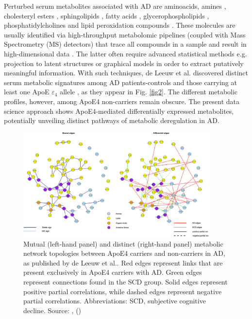 \documentclass{amsart}
\begin{document}
Perturbed serum metabolites associated with AD are aminoacids, amines \cite{deLeeuw2017Blood-basedDisease, Green2023InvestigatingDisease}, cholesteryl esters \cite{Proitsi2017AssociationAnalysis}, sphingolipids \cite{Varma2018BrainStudy,Sun2022AssociationDisease,Green2023InvestigatingDisease,Oeckl2019GlialImpairment,Barupal2019SetsPathophysiology}, fatty acids \cite{Fernandez-Calle2022APOEDiseases,deLeeuw2017Blood-basedDisease}, glycerophospholipids \cite{Varma2018BrainStudy, Jia2022ATypes,Huo2020BrainAnalysis, Weng2019TheImpairment}, phosphatidylcholines \cite{Simpson2016BloodAging} and lipid peroxidation compounds \cite{Fernandez-Calle2022APOEDiseases}. These molecules are usually identified via high-throughput metabolomic pipelines (coupled with Mass Spectrometry (MS) detectors) that trace all compounds in a sample and result in high-dimensional data \cite{Oka2023MultiomicsCohort}. The latter often require advanced statistical methods e.g. projection to latent structures \cite{Weng2019TheImpairment, Peeters2019StableData} or graphical models \cite{Peeters2022Rags2ridges:Matrices} in order to extract putatively meaningful information. 
With such techniques, de Leeuw et al. discovered distinct serum metabolic signatures among AD patients-controls and those carrying at least one ApoE $\varepsilon_4$ allele \cite{deLeeuw2017Blood-basedDisease}, as they appear in Fig. \ref{fig2}. The different metabolic profiles, however, among ApoE4 non-carriers remain obscure. The present data science approach shows ApoE4-mediated differentially expressed metabolites, potentially unveiling distinct pathways of metabolic deregulation in AD.

\begin{figure}[htb]
\vspace*{-0.2cm}
  \includegraphics[width=0.9\textwidth]{figures/network.jpeg}
    \caption{Mutual (left-hand panel) and distinct (right-hand panel) metabolic network topologies between ApoE4 carriers and non-carriers in AD, as published by de Leeuw et al.. Red edges represent links that are present exclusively in ApoE4 carriers with AD. Green edges represent connections found in the SCD group. Solid edges represent positive partial correlations, while dashed edges represent negative partial correlations. Abbreviations: SCD, subjective cognitive decline. Source: ,  (\citeyear{deLeeuw2017Blood-basedDisease}) \cite{deLeeuw2017Blood-basedDisease}}
  \label{fig3}
\end{figure}
\end{document}
